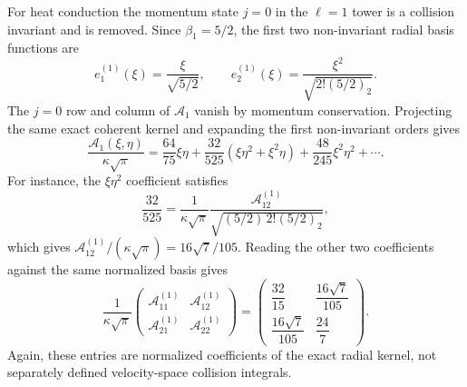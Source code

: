 \documentclass[11pt]{article}
\numberwithin{equation}{section}
\theoremstyle{definition}
\begin{document}
For heat conduction the momentum state $j=0$ in the $\ell=1$ tower is a
collision invariant and is removed.  Since $\beta_1=5/2$, the first two
non-invariant radial basis functions are
\begin{equation}
 e_1^{(1)}(\xi)=\frac{\xi}{\sqrt{5/2}},
 \qquad
 e_2^{(1)}(\xi)=\frac{\xi^2}{\sqrt{2!(5/2)_2}}.
 \label{eq:l1_radial_basis_low}
\end{equation}
The $j=0$ row and column of $\mathscr A_1$ vanish by momentum conservation.
Projecting the same exact coherent kernel and expanding the first
non-invariant orders gives
\begin{equation}
 \frac{\mathscr A_1(\xi,\eta)}{\kappa\sqrt\pi}
 =\frac{64}{75}\xi\eta
 +\frac{32}{525}(\xi\eta^2+\xi^2\eta)
 +\frac{48}{245}\xi^2\eta^2+\cdots .
 \label{eq:A1_radial_low_expansion}
\end{equation}
For instance, the $\xi\eta^2$ coefficient satisfies
\begin{equation}
 \frac{32}{525}
 =\frac{1}{\kappa\sqrt\pi}
 \frac{\mathcal A^{(1)}_{12}}
 {\sqrt{(5/2)\,2!(5/2)_2}},
\end{equation}
which gives $\mathcal A^{(1)}_{12}/(\kappa\sqrt\pi)=16\sqrt7/105$.
Reading the other two coefficients against the same normalized basis gives
\begin{equation}
 \boxed{
 \frac{1}{\kappa\sqrt\pi}
 \begin{pmatrix}
 \mathcal A^{(1)}_{11}&\mathcal A^{(1)}_{12}\\
 \mathcal A^{(1)}_{21}&\mathcal A^{(1)}_{22}
 \end{pmatrix}
 =
 \begin{pmatrix}
 \dfrac{32}{15}&\dfrac{16\sqrt7}{105}\\[2mm]
 \dfrac{16\sqrt7}{105}&\dfrac{24}{7}
 \end{pmatrix}.
 }
 \label{eq:l1_two_state_block}
\end{equation}
Again, these entries are normalized coefficients of the exact radial kernel,
not separately defined velocity-space collision integrals.
\end{document}
